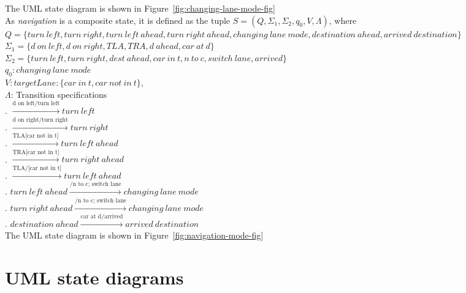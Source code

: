 \documentclass[12pt]{article}
\begin{document}
\begin{spacing}{1.5}
\noindent The UML state diagram is shown in Figure~\ref{fig:changing-lane-mode-fig}\\


\noindent As \textit{navigation} is a composite state, it is defined as the tuple $S = (Q, \Sigma_1, \Sigma_2, q_0, V, \Lambda)$, where\\

\noindent $Q = \{turn~left,turn~right, turn~left~ahead, turn~right~ahead, changing~lane~mode,destination~ahead, arrived~destination\}$\\
\noindent $\Sigma_1 = \{d~on~left, d~on~right, TLA, TRA, d~ahead, car~at~d\}$\\
\noindent $\Sigma_2 = \{turn~left, turn~right, dest~ahead, car~in~t, n~to~c, switch~lane, arrived\}$\\
\noindent $q_0: changing~lane~mode$\\
\noindent $V: targetLane: \{car~in~t, car~not~in~t\}$,\\
\noindent $\Lambda$: Transition specifications\\
. $\xrightarrow {\text{d on left/turn left}} turn~left$\\
. $\xrightarrow {\text{d on right/turn right}} turn~right$\\
. $\xrightarrow {\text{TLA[car not in t]}} turn~left~ahead$\\
. $\xrightarrow {\text{TRA[car not in t]}} turn~right~ahead$\\
. $\xrightarrow {\text{TLA/[car not in t]}} turn~left~ahead$\\
. $turn~left~ahead\xrightarrow {\text{/n to c; switch lane}} changing~lane~mode$\\
. $turn~right~ahead\xrightarrow {\text{/n to c; switch lane}} changing~lane~mode$\\
. $destination~ahead\xrightarrow {\text{car at d/arrived}} arrived~destination$\\

\noindent The UML state diagram is shown in Figure~\ref{fig:navigation-mode-fig}\\

\newpage

\section{UML state diagrams}


\end{spacing}
\end{document}
